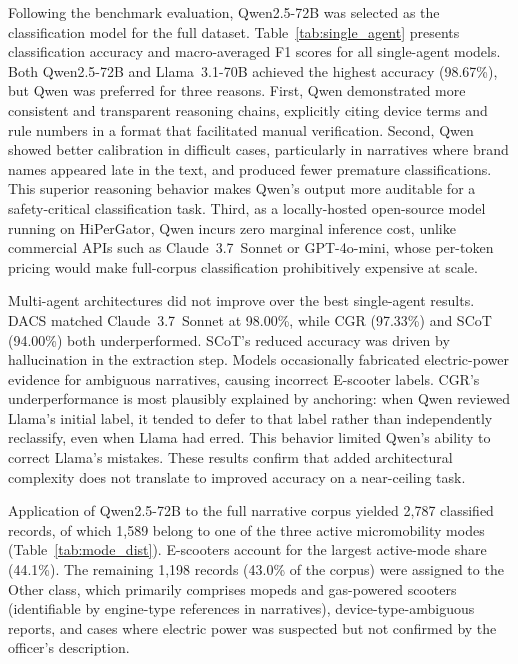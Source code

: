 \documentclass[numbered]{trbunofficial}
\begin{document}
Following the benchmark evaluation, Qwen2.5-72B was selected as the classification model for the full dataset. Table~\ref{tab:single_agent} presents classification accuracy and macro-averaged F1 scores for all single-agent models. Both Qwen2.5-72B and Llama~3.1-70B achieved the highest accuracy (98.67\%), but Qwen was preferred for three reasons. First, Qwen demonstrated more consistent and transparent reasoning chains, explicitly citing device terms and rule numbers in a format that facilitated manual verification. Second, Qwen showed better calibration in difficult cases, particularly in narratives where brand names appeared late in the text, and produced fewer premature classifications. This superior reasoning behavior makes Qwen's output more auditable for a safety-critical classification task. Third, as a locally-hosted open-source model running on HiPerGator, Qwen incurs zero marginal inference cost, unlike commercial APIs such as Claude~3.7~Sonnet or GPT-4o-mini, whose per-token pricing would make full-corpus classification prohibitively expensive at scale.





Multi-agent architectures did not improve over the best single-agent results. DACS matched Claude~3.7~Sonnet at 98.00\%, while CGR (97.33\%) and SCoT (94.00\%) both underperformed. SCoT's reduced accuracy was driven by hallucination in the extraction step. Models occasionally fabricated electric-power evidence for ambiguous narratives, causing incorrect E-scooter labels. CGR's underperformance is most plausibly explained by anchoring: when Qwen reviewed Llama's initial label, it tended to defer to that label rather than independently reclassify, even when Llama had erred. This behavior limited Qwen's ability to correct Llama's mistakes. These results confirm that added architectural complexity does not translate to improved accuracy on a near-ceiling task.


Application of Qwen2.5-72B to the full narrative corpus yielded 2,787 classified records, of which 1,589 belong to one of the three active micromobility modes (Table~\ref{tab:mode_dist}). E-scooters account for the largest active-mode share (44.1\%). The remaining 1,198 records (43.0\% of the corpus) were assigned to the Other class, which primarily comprises mopeds and gas-powered scooters (identifiable by engine-type references in narratives), device-type-ambiguous reports, and cases where electric power was suspected but not confirmed by the officer's description.
\end{document}
